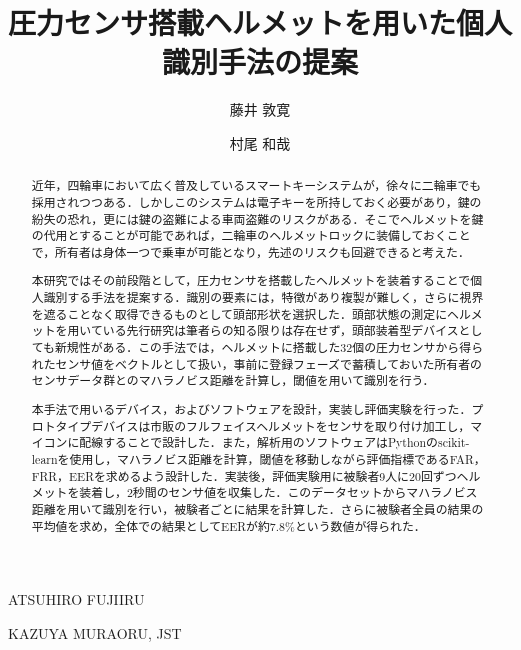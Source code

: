\documentclass[Japanese]{dicomopapers}
\begin{document}
\title{圧力センサ搭載ヘルメットを用いた個人識別手法の提案}


\author{藤井 敦寛}{ATSUHIRO FUJII}{RU}
\author{村尾 和哉}{KAZUYA MURAO}{RU, JST}

\begin{abstract}
近年，四輪車において広く普及しているスマートキーシステムが，徐々に二輪車でも採用されつつある．しかしこのシステムは電子キーを所持しておく必要があり，鍵の紛失の恐れ，更には鍵の盗難による車両盗難のリスクがある．そこでヘルメットを鍵の代用とすることが可能であれば，二輪車のヘルメットロックに装備しておくことで，所有者は身体一つで乗車が可能となり，先述のリスクも回避できると考えた．\par
本研究ではその前段階として，圧力センサを搭載したヘルメットを装着することで個人識別する手法を提案する．識別の要素には，特徴があり複製が難しく，さらに視界を遮ることなく取得できるものとして頭部形状を選択した．頭部状態の測定にヘルメットを用いている先行研究は筆者らの知る限りは存在せず，頭部装着型デバイスとしても新規性がある．この手法では，ヘルメットに搭載した32個の圧力センサから得られたセンサ値をベクトルとして扱い，事前に登録フェーズで蓄積しておいた所有者のセンサデータ群とのマハラノビス距離を計算し，閾値を用いて識別を行う．\par
本手法で用いるデバイス，およびソフトウェアを設計，実装し評価実験を行った．プロトタイプデバイスは市販のフルフェイスヘルメットをセンサを取り付け加工し，マイコンに配線することで設計した．また，解析用のソフトウェアはPythonのscikit-learnを使用し，マハラノビス距離を計算，閾値を移動しながら評価指標であるFAR，FRR，EERを求めるよう設計した．実装後，評価実験用に被験者9人に20回ずつヘルメットを装着し，2秒間のセンサ値を収集した．このデータセットからマハラノビス距離を用いて識別を行い，被験者ごとに結果を計算した．さらに被験者全員の結果の平均値を求め，全体での結果としてEERが約7.8\%という数値が得られた．
\end{abstract}

\maketitle

\end{document}
